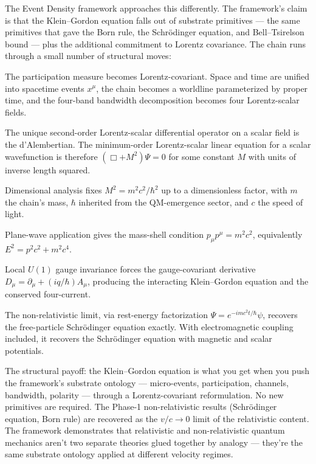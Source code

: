\documentclass[11pt,a4paper]{article}
\begin{document}
The Event Density framework approaches this differently. The framework's claim is that the Klein--Gordon equation falls out of substrate primitives --- the same primitives that gave the Born rule, the Schr\"odinger equation, and Bell--Tsirelson bound --- plus the additional commitment to Lorentz covariance. The chain runs through a small number of structural moves:

The participation measure becomes Lorentz-covariant. Space and time are unified into spacetime events $x^\mu$, the chain becomes a worldline parameterized by proper time, and the four-band bandwidth decomposition becomes four Lorentz-scalar fields.

The unique second-order Lorentz-scalar differential operator on a scalar field is the d'Alembertian. The minimum-order Lorentz-scalar linear equation for a scalar wavefunction is therefore $(\Box + M^2)\Psi = 0$ for some constant $M$ with units of inverse length squared.

Dimensional analysis fixes $M^2 = m^2c^2/\hbar^2$ up to a dimensionless factor, with $m$ the chain's mass, $\hbar$ inherited from the QM-emergence sector, and $c$ the speed of light.

Plane-wave application gives the mass-shell condition $p_\mu p^\mu = m^2c^2$, equivalently $E^2 = p^2c^2 + m^2c^4$.

Local $U(1)$ gauge invariance forces the gauge-covariant derivative $D_\mu = \partial_\mu + (iq/\hbar)A_\mu$, producing the interacting Klein--Gordon equation and the conserved four-current.

The non-relativistic limit, via rest-energy factorization $\Psi = e^{-imc^2t/\hbar}\psi$, recovers the free-particle Schr\"odinger equation exactly. With electromagnetic coupling included, it recovers the Schr\"odinger equation with magnetic and scalar potentials.

The structural payoff: the Klein--Gordon equation is what you get when you push the framework's substrate ontology --- micro-events, participation, channels, bandwidth, polarity --- through a Lorentz-covariant reformulation. No new primitives are required. The Phase-1 non-relativistic results (Schr\"odinger equation, Born rule) are recovered as the $v/c \to 0$ limit of the relativistic content. The framework demonstrates that relativistic and non-relativistic quantum mechanics aren't two separate theories glued together by analogy --- they're the same substrate ontology applied at different velocity regimes.
\end{document}
